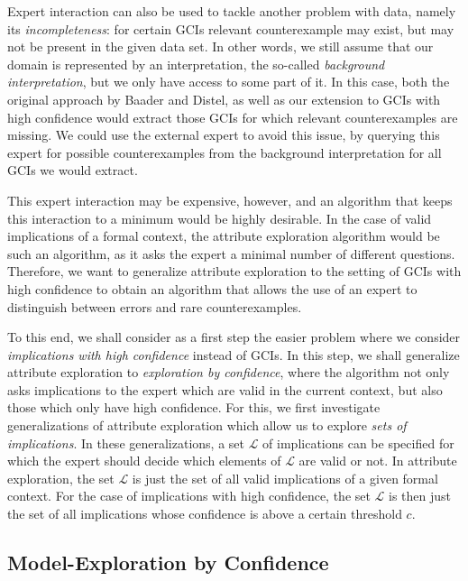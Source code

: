 Expert interaction can also be used to tackle another problem with data, namely its
\emph{incompleteness}: for certain GCIs relevant counterexample may exist, but may not be
present in the given data set.  In other words, we still assume that our domain is
represented by an interpretation, the so-called \emph{background interpretation}, but we
only have access to some part of it.  In this case, both the original approach by Baader
and Distel, as well as our extension to GCIs with high confidence would extract those GCIs
for which relevant counterexamples are missing.  We could use the external expert to avoid
this issue, by querying this expert for possible counterexamples from the background
interpretation for all GCIs we would extract.

This expert interaction may be expensive, however, and an algorithm that keeps this
interaction to a minimum would be highly desirable.  In the case of valid implications of
a formal context, the attribute exploration algorithm would be such an algorithm, as it
asks the expert a minimal number of different questions.  Therefore, we want to generalize
attribute exploration to the setting of GCIs with high confidence to obtain an algorithm
that allows the use of an expert to distinguish between errors and rare counterexamples.

To this end, we shall consider as a first step the easier problem where we consider
\emph{implications with high confidence} instead of GCIs.  In this step, we shall
generalize attribute exploration to \emph{exploration by confidence}, where the algorithm
not only asks implications to the expert which are valid in the current context, but also
those which only have high confidence.  For this, we first investigate generalizations of
attribute exploration which allow us to explore \emph{sets of implications}.  In these
generalizations, a set $\mathcal{L}$ of implications can be specified for which the expert
should decide which elements of $\mathcal{L}$ are valid or not.  In attribute exploration,
the set $\mathcal{L}$ is just the set of all valid implications of a given formal context.
For the case of implications with high confidence, the set $\mathcal{L}$ is then just the
set of all implications whose confidence is above a certain threshold $c$.

\subsection{Model-Exploration by Confidence}
\label{sec:model-expl-conf}

